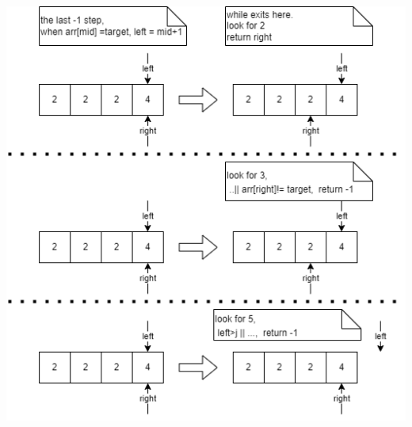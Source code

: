 \documentclass[a4paper,11pt,twoside]{book}
\begin{document}
\begin{itemize}
\begin{enumerate}
\begin{center}
		\includegraphics[width=0.7\linewidth]{pics/binary_search.drawio.png}
\end{center}

\end{enumerate}

\end{itemize}
\end{document}
